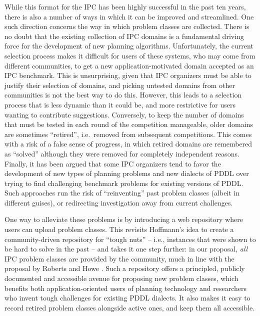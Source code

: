 While this format for the IPC has been highly successful in the past
ten years, there is also a number of ways in which it can be improved and
streamlined.  One such direction concerns the way in which problem classes
are collected.  There is no doubt that the existing collection of IPC
domains is a fundamental driving force for the development of new planning
algorithms.  Unfortunately, the current selection process makes it
difficult for users of these systems, who may come from different
communities, to get a new application-motivated domain accepted as an IPC
benchmark.  This is unsurprising, given that IPC organizers must be able to
justify their selection of domains, and picking untested domains from other
communities is not the best way to do this.  However, this leads to a
selection process that is less dynamic than it could be, and more
restrictive for users wanting to contribute suggestions.  Conversely, to
keep the number of domains that must be tested in each round of the
competition manageable, older domains are sometimes ``retired'', i.e.\
removed from subsequent competitions.  This comes with a risk of a false
sense of progress, in which retired domains are remembered as ``solved''
although they were removed for completely independent reasons.  Finally, it
has been argued \cite{ToughNuts} that some IPC organizers tend to favor the
development of new types of planning problems and new dialects of PDDL over
trying to find challenging benchmark problems for existing versions of
PDDL. Such approaches run the risk of ``reinventing'' past problem classes
(albeit in different guises), or redirecting investigation away from
current challenges.

One way to alleviate these problems is by introducing a web repository
where users can upload problem classes. This revisits Hoffmann's
\shortcite{ToughNuts} idea to create a community-driven repository for
``tough nuts'' -- i.e., instances that were shown to be hard to solve in
the past -- and takes it one step further: in our proposal, \emph{all} IPC
problem classes are provided by the community, much in line with the
proposal by Roberts and Howe \shortcite{roberts07:_call_for_partic}. Such a
repository offers a principled, publicly documented and accessible avenue
for proposing new problem classes, which benefits both application-oriented
users of planning technology and researchers who invent tough challenges
for existing PDDL dialects. It also makes it easy to record retired problem
classes alongside active ones, and keep them all accessible.

